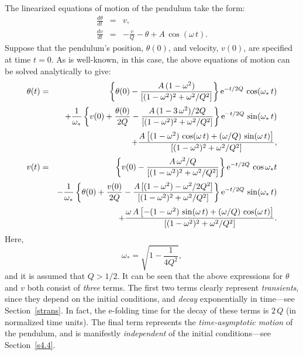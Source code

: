 The linearized equations of motion of the pendulum take the form:
\begin{eqnarray}
\frac{d\theta}{dt} &=& v,\label{e16.13}\\[0.5ex]
\frac{dv}{dt} &=& -\frac{v}{Q} -\theta + A\,\cos(\omega \,t).\label{e16.14}
\end{eqnarray}
 Suppose
that the pendulum's position, $\theta(0)$, and velocity, $v(0)$,  are specified at time $t=0$. 
As is well-known, in this case, the above equations of motion can be solved analytically to give:
\begin{eqnarray}
\theta(t) &=&\left\{\theta(0) - \frac{A\,(1-\omega^2)}{[(1-\omega^2)^2+\omega^2/Q^2]}\right\}
{\rm e}^{-t/2Q}\,\cos(\omega_\ast\, t)\nonumber\\[0.5ex]
&&+\frac{1}{\omega_\ast}\left\{ v(0) + \frac{\theta(0)}{2Q}
-\frac{A\,(1-3\,\omega^2)/2Q}
{[(1-\omega^2)^2+ \omega^2/Q^2]}\right\}{\rm e}^{-t/2Q}\,\sin(\omega_\ast\,t) \nonumber\\[0.5ex]
 &&+\frac{A\left[(1-\omega^2)\,\cos(\omega\, t)+ (\omega/Q)\,\sin(\omega\, t)\right]}
{\left[(1-\omega^2)^2+\omega^2/Q^2\right]},\label{e16.15}\\[0.5ex]
v(t) &=& \left\{v(0) - \frac{A\,\omega^2/Q}{[(1-\omega^2)^2+\omega^2/Q^2]}\right\}
{\rm e}^{-t/2Q}\,\cos\omega_\ast t\nonumber\\[0.5ex]
&&-\frac{1}{\omega_\ast}\left\{ \theta(0) + \frac{v(0)}{2Q}
-\frac{A\,[(1-\omega^2)-\omega^2/2Q^2]}
{[(1-\omega^2)^2+ \omega^2/Q^2]}\right\}{\rm e}^{-t/2Q}\,\sin(\omega_\ast\, t)\nonumber\\[0.5ex]
&&+\frac{\omega\,A\left[-(1-\omega^2)\,\sin(\omega\, t)+ (\omega/Q)\,\cos(\omega\, t)\right]}
{\left[(1-\omega^2)^2+\omega^2/Q^2\right]}.\label{e16.16}
\end{eqnarray}
Here, 
\begin{equation}
\omega_\ast = \sqrt{1-\frac{1}{4Q^2}},
\end{equation}
and it is assumed that $Q>1/2$. 
It can be seen that the above expressions for $\theta$ and $v$  both consist  of {\em three}\/
terms. The first two terms clearly represent {\em transients},  since they depend on the initial
conditions, and {\em decay}\/ exponentially in time---see Section~\ref{strans}. In fact, the e-folding time for the decay of these
terms is $2\,Q$ (in normalized time units). 
The final term represents the {\em time-asymptotic motion}\/ of the pendulum, and is manifestly {\em independent}\/ of the initial conditions---see Section~\ref{s4.4}.

